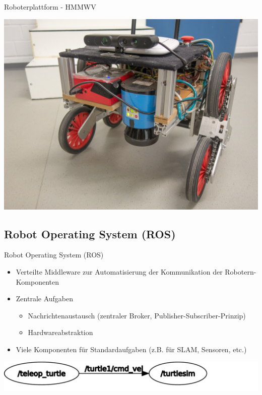 \documentclass[18pt]{beamer}
\begin{document}
\begin{frame}{Roboterplattform - HMMWV}
\begin{center}
	\includegraphics[scale=0.4]{images/hmmwv.jpg}
\end{center}
\end{frame}


\subsection{Robot Operating System (ROS)}
\begin{frame}{Robot Operating System (ROS)}
\begin{itemize}
	\item Verteilte Middleware zur Automatisierung der Kommunikation der Robotern-Komponenten
	\item Zentrale Aufgaben
	\begin{itemize}
		\item Nachrichtenaustausch (zentraler Broker, Publisher-Subscriber-Prinzip)
		\item Hardwareabstraktion
	\end{itemize}
	\item Viele Komponenten für Standardaufgaben (z.B. für SLAM, Sensoren, etc.)
\end{itemize}
\begin{center}
	\includegraphics[scale=0.35]{images/rosgraph_turtlesim.pdf}
\end{center}
\end{frame}
\end{document}
